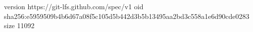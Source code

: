 version https://git-lfs.github.com/spec/v1
oid sha256:e5959509b4b6d67a08f5c105d5b442d3b5b13495aa2bd3c558a1e6d90cde0283
size 11092
